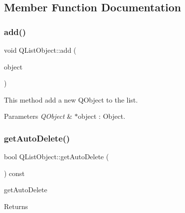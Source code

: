 \subsection{Member Function Documentation}
\mbox{\label{class_q_list_object_ad5e960eabd3e9b7d49228ea7549a9bd7}} 
\subsubsection{\texorpdfstring{add()}{add()}}
{\footnotesize\ttfamily void Q\+List\+Object\+::add (\begin{DoxyParamCaption}\item[{Q\+Object $\ast$}]{object }\end{DoxyParamCaption})}



This method add a new Q\+Object to the list. 


\begin{DoxyParams}{Parameters}
{\em Q\+Object} & $\ast$object \+: Object. \\
\hline
\end{DoxyParams}
\mbox{\label{class_q_list_object_ad9d1f7e3c9f2563bcded31b02edc06fb}} 
\subsubsection{\texorpdfstring{get\+Auto\+Delete()}{getAutoDelete()}}
{\footnotesize\ttfamily bool Q\+List\+Object\+::get\+Auto\+Delete (\begin{DoxyParamCaption}{ }\end{DoxyParamCaption}) const}



get\+Auto\+Delete 

\begin{DoxyReturn}{Returns}

\end{DoxyReturn}
\mbox{\label{class_q_list_object_a6f07490df1b1ba2ed37c7f322e12017b}} 
